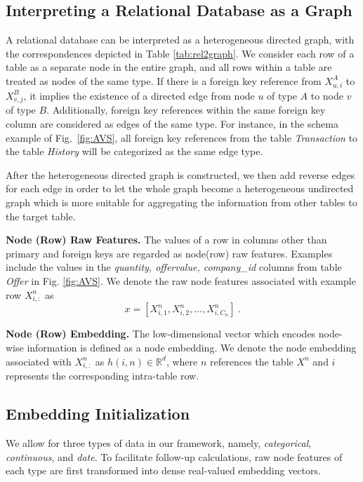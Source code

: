 \subsection{Interpreting a Relational Database as a Graph}

A relational database can be interpreted as a heterogeneous directed graph, with the correspondences depicted in Table \ref{tab:rel2graph}.  We consider each row of a table as a separate node in the entire graph, and all rows within a table are treated as nodes of the same type. If there is a foreign key reference from $X^{A}_{u,i}$ to $X^{B}_{v,j}$, it implies the existence of a directed edge from node $u$ of type $A$ to node $v$ of type $B$. 
Additionally, foreign key references within the same foreign key column are considered as edges of the same type. For instance, in the schema example of Fig.~\ref{fig:AVS}, all foreign key references from the table \textit{Transaction} to the table \textit{History} will be categorized as the same edge type.

After the heterogeneous directed graph is constructed, we then add reverse edges for each edge in order to let the whole graph become a heterogeneous undirected graph which is more suitable for aggregating the information from other tables to the target table.

\header
\textbf{Node (Row) Raw Features.} The values of a row in columns other than primary and foreign keys are regarded as node(row) raw features. Examples include the values in the \textit{quantity, offervalue, company\_id} columns from table \textit{Offer} in Fig. \ref{fig:AVS}. We denote the raw node features associated with example row $X_{i,:}^n$ as 
\begin{equation}
    x=[X_{i,1}^n, X_{i,2}^n, \ldots, X_{i,C_n}^n]~.
\end{equation}

\header
\textbf{Node (Row) Embedding.} The low-dimensional vector which encodes node-wise information is defined as a node embedding. We denote the node embedding associated with $X_{i,:}^n$ as $h(i, n)\in \mathbb{R}^d$, 
where $n$ references the table $X^n$ and $i$ represents the corresponding intra-table row.

\subsection{Embedding Initialization}
We allow for three types of data in our framework, namely, \textit{categorical}, \textit{continuous}, and \textit{date}. To facilitate follow-up calculations, raw node features of each type are first transformed into dense real-valued embedding vectors.

